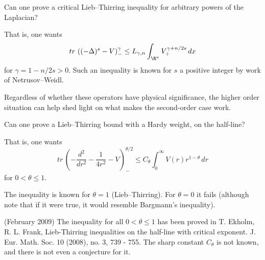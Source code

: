 \documentclass[12pt,letterpaper, reqno]{amsart}
\begin{document}
\begin{problemblock} 
\begin{problem}[2.73] 
Can one prove a critical Lieb--Thirring inequality for arbitrary powers of
the Laplacian?
\end{problem}

\begin{distinguishedremark}
That is, one wants
\[
{tr\,} \left( (-\Delta)^s - V \right)_-^\gamma \leq
L_{\gamma,n} \int_{\R^n} V_+^{\gamma + n/2s} \, dx
\]
for $\gamma = 1 - n/2s > 0$. Such an inequality is known for $s$ a
positive integer by work of Netrusov--Weidl.
\end{distinguishedremark}


\begin{remark} 
Regardless of whether these operators have
physical significance, the higher order situation can help shed
light on what makes the second-order case work.
\end{remark}

\end{problemblock}


\begin{problemblock} 
\begin{problem}[2.76] 
Can one prove a Lieb--Thirring bound with a Hardy
weight, on the half-line?
\end{problem}

\begin{distinguishedremark}
 That is, one wants
\[
{tr\,} \left( -\frac{d^2}{dr^2} - \frac{1}{4r^2} - V
\right)_{\! -}^{\theta/2}  \leq C_\theta \int_0^\infty V(r)
r^{1-\theta}\, dr
\]
for $0 < \theta \leq 1$.
\end{distinguishedremark}
\begin{remark}
The inequality is known for $\theta=1$
(Lieb--Thirring). For $\theta=0$ it fails (although note that if it
were true, it would resemble Bargmann's inequality).
\end{remark}

\begin{remark}
(February 2009) The inequality for all $0 < \theta \leq 1$ has been
proved in T. Ekholm, R. L. Frank,  Lieb-Thirring inequalities on
the half-line with critical exponent. J. Eur. Math. Soc. 10 (2008),
no. 3, 739 - 755. The sharp constant
$C_\theta$ is not known, and there is not even a conjecture for it.
\end{remark}

\end{problemblock}
\end{document}
